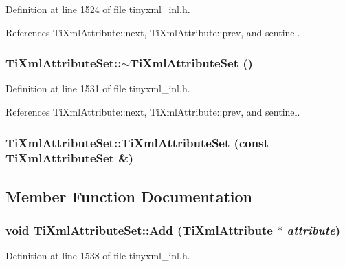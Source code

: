 Definition at line 1524 of file tinyxml\_\-inl.h.

References TiXmlAttribute::next, TiXmlAttribute::prev, and sentinel.\hypertarget{class_ti_xml_attribute_set_add463905dff96142a29fe16a01ecf28f}{
\subsubsection[{$\sim$TiXmlAttributeSet}]{\setlength{\rightskip}{0pt plus 5cm}TiXmlAttributeSet::$\sim$TiXmlAttributeSet ()}}
\label{class_ti_xml_attribute_set_add463905dff96142a29fe16a01ecf28f}


Definition at line 1531 of file tinyxml\_\-inl.h.

References TiXmlAttribute::next, TiXmlAttribute::prev, and sentinel.\hypertarget{class_ti_xml_attribute_set_acb244bc616c28b1c4b8e8417f28e5f9e}{
\subsubsection[{TiXmlAttributeSet}]{\setlength{\rightskip}{0pt plus 5cm}TiXmlAttributeSet::TiXmlAttributeSet (const {\bf TiXmlAttributeSet} \&)}}
\label{class_ti_xml_attribute_set_acb244bc616c28b1c4b8e8417f28e5f9e}


\subsection{Member Function Documentation}
\hypertarget{class_ti_xml_attribute_set_a745e50ddaae3bee93e4589321e0b9c1a}{
\subsubsection[{Add}]{\setlength{\rightskip}{0pt plus 5cm}void TiXmlAttributeSet::Add ({\bf TiXmlAttribute} $\ast$ {\em attribute})}}
\label{class_ti_xml_attribute_set_a745e50ddaae3bee93e4589321e0b9c1a}


Definition at line 1538 of file tinyxml\_\-inl.h.


